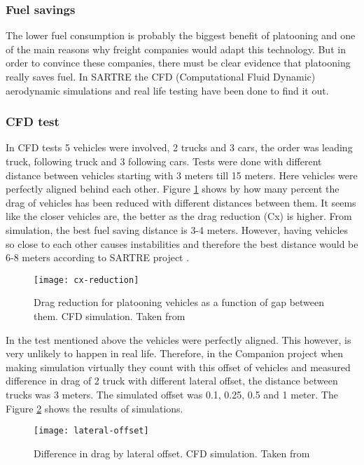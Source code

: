 \subsubsection{Fuel savings}
% 
The lower fuel consumption is probably the biggest benefit of platooning and one of the main reasons why freight companies would adapt this technology. But in order to convince these companies, there must be clear evidence that platooning really saves fuel. In SARTRE \cite{Chan2012ProjectSARTRE} the CFD (Computational Fluid Dynamic) aerodynamic simulations and real life testing have been done to find it out.
%
\subsubsection*{CFD test}
In CFD tests 5 vehicles were involved, 2 trucks and 3 cars, the order was leading truck, following truck and 3 following cars. Tests were done with different distance between vehicles starting with 3 meters till 15 meters. Here vehicles were perfectly aligned behind each other. Figure \ref{fig:cx-reduction} shows by how many percent the drag of vehicles has been reduced with different distances between them. It seems like the closer vehicles are, the better as the drag reduction (Cx) is higher. From simulation, the best fuel saving distance is 3-4 meters. However, having vehicles so close to each other causes instabilities and therefore the best distance would be 6-8 meters according to SARTRE project \cite[p. 33]{Chan2012ProjectSARTRE}.\par
% 
\begin{figure}[ht]
    \centering
    \texttt{[image: cx-reduction]}
    \caption{Drag reduction for platooning vehicles as a function of gap between them. CFD simulation. Taken from \cite{Chan2012ProjectSARTRE}}
    \label{fig:cx-reduction}
\end{figure}
% 
In the test mentioned above the vehicles were perfectly aligned. This however, is very unlikely to happen in real life. Therefore, in the Companion project when making simulation virtually they count with this offset of vehicles and measured difference in drag of 2 truck with different lateral offset, the distance between trucks was 3 meters. The simulated offset was 0.1, 0.25, 0.5 and 1 meter. The Figure \ref{fig:lateral-offset} shows the results of simulations.
% 
\begin{figure}[ht]
    \centering
    \texttt{[image: lateral-offset]}
    \caption{Difference in drag by lateral offset. CFD simulation. Taken from \cite[p. 19]{Laxhammar2015CooperativeConsumption}}
    \label{fig:lateral-offset}
\end{figure}
